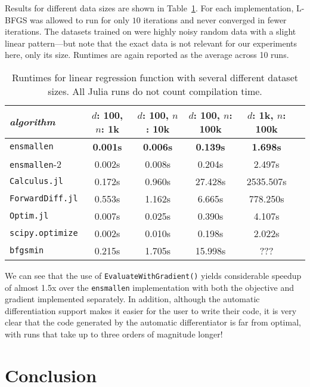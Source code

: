 \documentclass{article}
\begin{document}
Results for different data sizes are shown in Table~\ref{tab:lbfgs}.  For each
implementation, L-BFGS was allowed to run for only $10$ iterations and never
converged in fewer iterations.  The datasets trained on were highly noisy random
data with a slight linear pattern---but note that the exact data is not relevant
for our experiments here, only its size.  Runtimes are again reported as the
average across 10 runs.

\begin{table}
\begin{center}
\begin{tabular}{lccccc}
\toprule
{\em algorithm} & $d$: 100, $n$: 1k & $d$: 100, $n$: 10k & $d$: 100, $n$:
100k & $d$: 1k, $n$: 100k \\
\midrule
{\tt ensmallen} & {\bf 0.001s} & {\bf 0.006s} & {\bf 0.139s} & {\bf 1.698s} \\
{\tt ensmallen}-2 & 0.002s & 0.008s & 0.204s & 2.497s \\
{\tt Calculus.jl} & 0.172s & 0.960s & 27.428s & 2535.507s \\
{\tt ForwardDiff.jl} & 0.553s & 1.162s & 6.665s & 778.250s \\
{\tt Optim.jl} & 0.007s & 0.025s & 0.390s & 4.107s \\
{\tt scipy.optimize} & 0.002s & 0.010s & 0.198s & 2.022s \\
{\tt bfgsmin} & 0.215s & 1.705s & 15.998s & ??? \\
\bottomrule
\end{tabular}
\end{center}
\caption{Runtimes for linear regression function with several different dataset
sizes.  All Julia runs do not count compilation time.}
\label{tab:lbfgs}
\end{table}

We can see that the use of {\tt EvaluateWithGradient()} yields considerable
speedup of almost 1.5x over the {\tt ensmallen} implementation with both the
objective and gradient implemented separately.  In addition, although the
automatic differentiation support makes it easier for the user to write their
code, it is very clear that the code generated by the automatic differentiator
is far from optimal, with runs that take up to three orders of magnitude longer!

\vspace*{-0.3em}
\section{Conclusion}
\vspace*{-0.5em}
\end{document}
